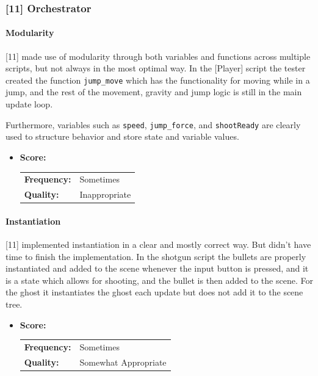 \subsubsection{[11] Orchestrator}

\paragraph{Modularity}

[11] made use of modularity through both variables and functions across multiple scripts, but not always in the most optimal way.
In the [Player] script the tester created the function \texttt{jump\_move} which has the functionality for moving while in a jump, and the rest of the movement, gravity and jump logic is still in the main update loop.

Furthermore, variables such as \texttt{speed}, \texttt{jump\_force}, and \texttt{shootReady} are clearly used to structure behavior and store state and variable values.

\begin{itemize}
    \item \textbf{Score:}
    \begin{tabular}{ll}
        \textbf{Frequency:} & Sometimes \\
        \textbf{Quality:}   & Inappropriate \\
    \end{tabular}
\end{itemize}

\paragraph{Instantiation}

[11] implemented instantiation in a clear and mostly correct way.
But didn't have time to finish the implementation.
In the shotgun script the bullets are properly instantiated and added to the scene whenever the input button is pressed, and it is a state which allows for shooting, and the bullet is then added to the scene.
For the ghost it instantiates the ghost each update but does not add it to the scene tree.

\begin{itemize}
    \item \textbf{Score:}
    \begin{tabular}{ll}
        \textbf{Frequency:} & Sometimes \\
        \textbf{Quality:}   & Somewhat Appropriate \\
    \end{tabular}
\end{itemize}

